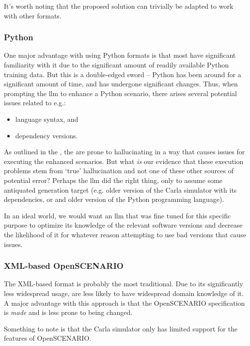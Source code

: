 It's worth noting that the proposed solution can trivially be adapted to work with other formats.

\subsubsection{Python}

One major advantage with using Python formats is that most  have significant
familiarity with it due to the significant amount of readily available Python training data. But this
is a double-edged sword -- Python has been around for a significant amount of time, and has
undergone significant changes. Thus, when prompting the \acrshort{llm} to enhance a Python scenario,
there arises several potential issues related to e.g.: \begin{itemize}
    \item language syntax, and
    \item dependency versions.
\end{itemize}

As outlined in the , the  are prone to hallucinating in a way that
causes issues for executing the enhanced scenarios. But what \emph{is} our evidence that these
execution problems stem from `true' hallucination and not one of these other sources of potential
error? Perhaps the \acrshort{llm} did the right thing, only to assume some antiquated generation
target (e.g. older version of the Carla simulator with its dependencies, or and older version of the
Python programming language).

In an ideal world, we would want an \acrshort{llm} that was fine tuned for this specific purpose to
optimize its knowledge of the relevant software versions and decrease the likelihood of it for
whatever reason attempting to use bad versions that cause issues.

\subsubsection{XML-based OpenSCENARIO}

The XML-based format is probably the most traditional. Due to its significantly less widespread
usage,  are less likely to have widespread domain knowledge of it. A major advantage
with this approach is that the OpenSCENARIO specification is \emph{made} and is less prone to being
changed.

Something to note is that the Carla simulator only has limited support for the
features of OpenSCENARIO.

